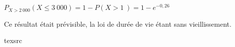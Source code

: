 \begin{corrige}
\begin{enumerate}
\begin{enumerate}[label=\alph*.]
               $P_{X > 2~000}\left(X\leqslant 3~000\right)=1-P\left(X > 1~\right)=1-e^{-0,26}$
               \par
               \par
               \par
               Ce résultat était prévisible, la loi de durée de vie étant sans vieillissement.
               \par
          \end{enumerate}
          \par
     \end{enumerate}
     \par
\end{corrige}
\par

\par
texsrc
